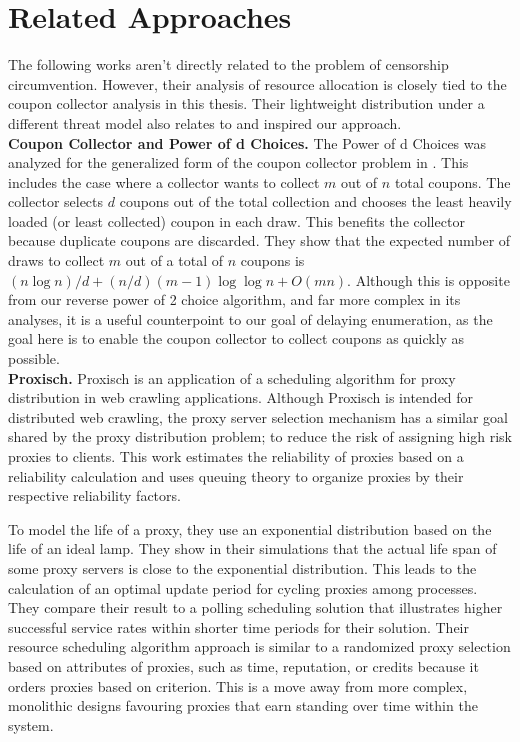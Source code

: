 \section{Related Approaches}

The following works aren't directly related to the problem of censorship circumvention. However, their analysis of resource allocation is closely tied to the coupon collector analysis in this thesis. Their lightweight distribution under a different threat model also relates to and inspired our approach.\\

\textbf{Coupon Collector and Power of d Choices.} The Power of d Choices was analyzed for the generalized form of the coupon collector problem in \cite{xu2011generalized}. This includes the case where a collector wants to collect $m$ out of $n$ total coupons. The collector selects $d$ coupons out of the total collection and chooses the least heavily loaded (or least collected) coupon in each draw. This benefits the collector because duplicate coupons are discarded. They show that the expected number of draws to collect $m$ out of a total of $n$ coupons is $(n \log{n})/d + (n/d )(m − 1) \log{\log{n}} + O (mn)$. Although this is opposite from our reverse power of 2 choice algorithm, and far more complex in its analyses, it is a useful counterpoint to our goal of delaying enumeration, as the goal here is to enable the coupon collector to collect coupons as quickly as possible.\\

\textbf{Proxisch.} Proxisch \cite{jiang2016proxisch} is an application of a scheduling algorithm for proxy distribution in web crawling applications. Although Proxisch is intended for distributed web crawling, the proxy server selection mechanism has a similar goal shared by the proxy distribution problem; to reduce the risk of assigning high risk proxies to clients. This work estimates the reliability of proxies based on a reliability calculation and uses queuing theory to organize proxies by their respective reliability factors. 

To model the life of a proxy, they use an exponential distribution based on the life of an ideal lamp. They show in their simulations that the actual life span of some proxy servers is close to the exponential distribution. This leads to the calculation of an optimal update period for cycling proxies among processes. They compare their result to a polling scheduling solution that illustrates higher successful service rates within shorter time periods for their solution. Their resource scheduling algorithm approach is similar to a randomized proxy selection based on attributes of proxies, such as time, reputation, or credits because it orders proxies based on criterion. This is a move away from more complex, monolithic designs favouring proxies that earn standing over time within the system. 

